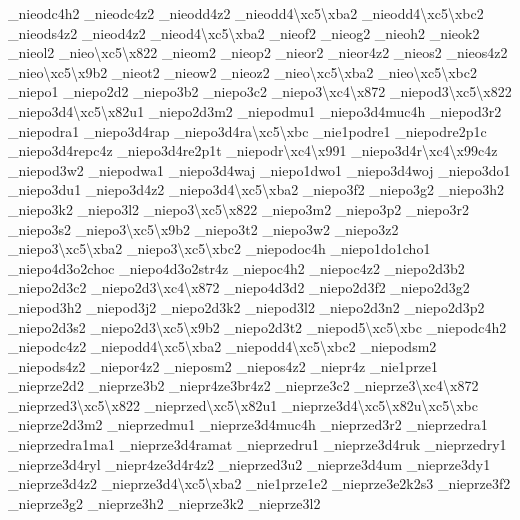 {\-\_\-nieodc4h2 \-\_\-nieodc4z2 \-\_\-nieodd4z2 \-\_\-nieodd4\textbackslash{}xc5\textbackslash{}xba2 \-\_\-nieodd4\textbackslash{}xc5\textbackslash{}xbc2 \-\_\-nieods4z2 \-\_\-nieod4z2 \-\_\-nieod4\textbackslash{}xc5\textbackslash{}xba2 \-\_\-nieof2 \-\_\-nieog2 \-\_\-nieoh2 \-\_\-nieok2 \-\_\-nieol2 \-\_\-nieo\textbackslash{}xc5\textbackslash{}x822 \-\_\-nieom2 \-\_\-nieop2 \-\_\-nieor2 \-\_\-nieor4z2 \-\_\-nieos2 \-\_\-nieos4z2 \-\_\-nieo\textbackslash{}xc5\textbackslash{}x9b2 \-\_\-nieot2 \-\_\-nieow2 \-\_\-nieoz2 \-\_\-nieo\textbackslash{}xc5\textbackslash{}xba2 \-\_\-nieo\textbackslash{}xc5\textbackslash{}xbc2 \-\_\-niepo1 \-\_\-niepo2d2 \-\_\-niepo3b2 \-\_\-niepo3c2 \-\_\-niepo3\textbackslash{}xc4\textbackslash{}x872 \-\_\-niepod3\textbackslash{}xc5\textbackslash{}x822 \-\_\-niepo3d4\textbackslash{}xc5\textbackslash{}x82u1 \-\_\-niepo2d3m2 \-\_\-niepodmu1 \-\_\-niepo3d4muc4h \-\_\-niepod3r2 \-\_\-niepodra1 \-\_\-niepo3d4rap \-\_\-niepo3d4ra\textbackslash{}xc5\textbackslash{}xbc \-\_\-nie1podre1 \-\_\-niepodre2p1c \-\_\-niepo3d4repc4z \-\_\-niepo3d4re2p1t \-\_\-niepodr\textbackslash{}xc4\textbackslash{}x991 \-\_\-niepo3d4r\textbackslash{}xc4\textbackslash{}x99c4z \-\_\-niepod3w2 \-\_\-niepodwa1 \-\_\-niepo3d4waj \-\_\-niepo1dwo1 \-\_\-niepo3d4woj \-\_\-niepo3do1 \-\_\-niepo3du1 \-\_\-niepo3d4z2 \-\_\-niepo3d4\textbackslash{}xc5\textbackslash{}xba2 \-\_\-niepo3f2 \-\_\-niepo3g2 \-\_\-niepo3h2 \-\_\-niepo3k2 \-\_\-niepo3l2 \-\_\-niepo3\textbackslash{}xc5\textbackslash{}x822 \-\_\-niepo3m2 \-\_\-niepo3p2 \-\_\-niepo3r2 \-\_\-niepo3s2 \-\_\-niepo3\textbackslash{}xc5\textbackslash{}x9b2 \-\_\-niepo3t2 \-\_\-niepo3w2 \-\_\-niepo3z2 \-\_\-niepo3\textbackslash{}xc5\textbackslash{}xba2 \-\_\-niepo3\textbackslash{}xc5\textbackslash{}xbc2 \-\_\-niepodoc4h \-\_\-niepo1do1cho1 \-\_\-niepo4d3o2choc \-\_\-niepo4d3o2str4z \-\_\-niepoc4h2 \-\_\-niepoc4z2 \-\_\-niepo2d3b2 \-\_\-niepo2d3c2 \-\_\-niepo2d3\textbackslash{}xc4\textbackslash{}x872 \-\_\-niepo4d3d2 \-\_\-niepo2d3f2 \-\_\-niepo2d3g2 \-\_\-niepod3h2 \-\_\-niepod3j2 \-\_\-niepo2d3k2 \-\_\-niepod3l2 \-\_\-niepo2d3n2 \-\_\-niepo2d3p2 \-\_\-niepo2d3s2 \-\_\-niepo2d3\textbackslash{}xc5\textbackslash{}x9b2 \-\_\-niepo2d3t2 \-\_\-niepod5\textbackslash{}xc5\textbackslash{}xbc \-\_\-niepodc4h2 \-\_\-niepodc4z2 \-\_\-niepodd4\textbackslash{}xc5\textbackslash{}xba2 \-\_\-niepodd4\textbackslash{}xc5\textbackslash{}xbc2 \-\_\-niepodsm2 \-\_\-niepods4z2 \-\_\-niepor4z2 \-\_\-nieposm2 \-\_\-niepos4z2 \-\_\-niepr4z \-\_\-nie1prze1 \-\_\-nieprze2d2 \-\_\-nieprze3b2 \-\_\-niepr4ze3br4z2 \-\_\-nieprze3c2 \-\_\-nieprze3\textbackslash{}xc4\textbackslash{}x872 \-\_\-nieprzed3\textbackslash{}xc5\textbackslash{}x822 \-\_\-nieprzed\textbackslash{}xc5\textbackslash{}x82u1 \-\_\-nieprze3d4\textbackslash{}xc5\textbackslash{}x82u\textbackslash{}xc5\textbackslash{}xbc \-\_\-nieprze2d3m2 \-\_\-nieprzedmu1 \-\_\-nieprze3d4muc4h \-\_\-nieprzed3r2 \-\_\-nieprzedra1 \-\_\-nieprzedra1ma1 \-\_\-nieprze3d4ramat \-\_\-nieprzedru1 \-\_\-nieprze3d4ruk \-\_\-nieprzedry1 \-\_\-nieprze3d4ryl \-\_\-niepr4ze3d4r4z2 \-\_\-nieprzed3u2 \-\_\-nieprze3d4um \-\_\-nieprze3dy1 \-\_\-nieprze3d4z2 \-\_\-nieprze3d4\textbackslash{}xc5\textbackslash{}xba2 \-\_\-nie1prze1e2 \-\_\-nieprze3e2k2s3 \-\_\-nieprze3f2 \-\_\-nieprze3g2 \-\_\-nieprze3h2 \-\_\-nieprze3k2 \-\_\-nieprze3l2 }
